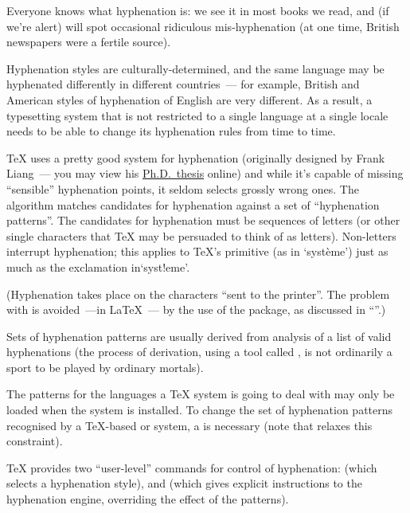 
Everyone knows what hyphenation is: we see it in most books we read,
and (if we're alert) will spot occasional ridiculous mis-hyphenation
(at one time, British newspapers were a fertile source).

Hyphenation styles are culturally-determined, and the same language
may be hyphenated differently in different countries~--- for example,
British and American styles of hyphenation of English are very
different.  As a result, a typesetting system that is not restricted
to a single language at a single locale needs to be able to change its
hyphenation rules from time to time.

\TeX{} uses a pretty good system for hyphenation (originally designed
by Frank Liang~--- you may view his %
\href{http://tug.org/docs/liang/}{Ph.D.\ thesis} online) and while
it's capable of missing ``sensible'' hyphenation points, it seldom
selects grossly wrong ones.  The
algorithm matches candidates for hyphenation against a set of
``hyphenation patterns''.  The candidates for hyphenation must be
sequences of letters (or other single characters that \TeX{} may be
persuaded to think of as letters).  Non-letters interrupt hyphenation;
this applies to \TeX{}'s  primitive (as in `syst\`eme')
just as much as the exclamation in`syst!eme'.

(Hyphenation takes place on the characters ``sent to the printer''.
The problem with  is avoided~---in \LaTeX{}~--- by the use
of the  package, as discussed in %
``''.)

Sets of hyphenation patterns are usually derived from analysis of
a list of valid hyphenations (the process of derivation, using a tool
called , is not ordinarily a sport to be played by
ordinary mortals).

The patterns for the languages a \TeX{} system is going to deal with
may only be loaded when the system is installed.  To change the set of
hyphenation patterns recognised by a \TeX{}-based or \xetex{} system,
a  is necessary (note that 
 relaxes this constraint).

\TeX{} provides two ``user-level'' commands for control of
hyphenation:  (which selects a hyphenation style), and
 (which gives explicit instructions to the hyphenation
engine, overriding the effect of the patterns).

